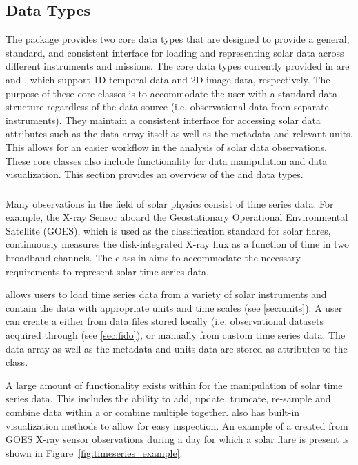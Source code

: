 \subsection{Data Types}
\label{sec:data_types}

The \sunpypkg package provides two core data types that are designed to provide a general, standard, and consistent interface for loading and representing solar data across different instruments and missions.
The core data types currently provided in \sunpypkg are \Timeseries and \Map, which support 1D temporal data and 2D image data, respectively. 
The purpose of these core classes is to accommodate the user with a standard data structure regardless of the data source (i.e. observational data from separate instruments). 
They maintain a consistent interface for accessing solar data attributes such as the data array itself as well as the metadata and relevant units. 
This allows for an easier workflow in the analysis of solar data observations.
These core classes also include functionality for data manipulation and data visualization. 
This section provides an overview of the \Timeseries and \Map data types.

\subsubsection{\Timeseries}
\label{sec:timeseries}
Many observations in the field of solar physics consist of time series data. 
For example, the X-ray Sensor aboard the Geostationary Operational Environmental Satellite (GOES), which is used as the classification standard for solar flares, continuously measures the disk-integrated X-ray flux as a function of time in two broadband channels. 
The \Timeseries class in \sunpypkg aims to accommodate the necessary requirements to represent solar time series data.

\Timeseries allows users to load time series data from a variety of solar instruments and contain the data with appropriate units and time scales (see \autoref{sec:units}). 
 A user can create a \Timeseries either from data files stored locally (i.e. observational datasets acquired through \Fido (see \autoref{sec:fido}), or manually from custom time series data. 
 The data array as well as the metadata and units data are stored as attributes to the \Timeseries class. 

A large amount of functionality exists within \Timeseries for the manipulation of solar time series data.
This includes the ability to add, update, truncate, re-sample and combine data within a \Timeseries or combine multiple \Timeseries together. 
\Timeseries also has built-in visualization methods to allow for easy inspection. 
An example of a \Timeseries created from GOES X-ray sensor observations during a day for which a solar flare is present is shown in Figure~\ref{fig:timeseries_example}.

